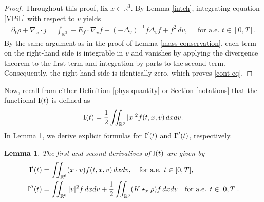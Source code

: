 \documentclass[reqno,11pt,final]{amsart}
\theoremstyle{plain}
\newtheorem{lemma}[theorem]{Lemma}
\numberwithin{equation}{section}
\numberwithin{theorem}{section}
\begin{document}
\begin{proof}
    Throughout this proof, fix $x\in\mathbb{R}^3$. By Lemma \ref{intch}, integrating equation \eqref{VPiL} with respect to $v$ yields
    \begin{align*}
        \partial_t\rho + \nabla_x\cdot j = \int_{\mathbb{R}^3} -E_f\cdot\nabla_vf + (-\Delta_v)^{-1}f\Delta_vf + f^2\,dv, \quad \text{ for a.e. }t\in[0,T].
    \end{align*}By the same argument as in the proof of Lemma \ref{mass conservation}, each term on the right-hand side is integrable in $v$ and vanishes by applying the divergence theorem to the first term and integration by parts to the second term. Consequently, the right-hand side is identically zero, which proves \eqref{cont eq}.
\end{proof}


Now, recall from either Definition \ref{phys quantity} or Section \ref{notations} that  the functional $\textup{I}(t) $ is defined as
\begin{align*}
\textup{I}(t) = \frac{1}{2}\iint_{\mathbb{R}^6} |x|^2f(t,x,v)\,dxdv.
\end{align*} In Lemma \ref{I' I''}, we derive explicit formulas for $\textup{I}'(t)$ and $\textup{I}''(t)$, respectively.

\begin{lemma}\label{I' I''} The first and second derivatives of $\textup{I}(t)$ are given by
\begin{align*}
\textup{I}'(t) &= \iint_{\mathbb{R}^6} (x\cdot v)f(t,x,v)\,dxdv, \quad \textup{for a.e. }t\in[0,T],\\
\textup{I}''(t) &= \iint_{\mathbb{R}^6} |v|^2f\,dxdv+\frac{1}{2}\iint_{\mathbb{R}^6} (K\star_x \rho) f \,dxdv \quad \textup{for a.e. }t\in[0,T].
\end{align*}
\end{lemma}
\end{document}
